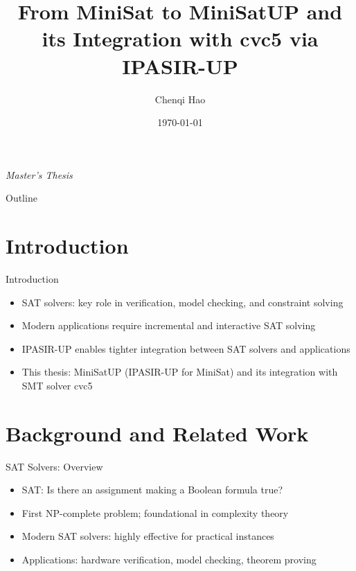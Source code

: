 \documentclass{beamer}
\title[MiniSatUP and its Integration with cvc5]{From MiniSat to MiniSatUP and its Integration with cvc5 via IPASIR-UP}
\author{Chenqi Hao}
\institute{University of Freiburg}
\date{\today}
\begin{document}
\begin{frame}
  \centering \textit{Master's Thesis}
  \titlepage
\end{frame}

\begin{frame}{Outline}
  \tableofcontents
\end{frame}


\section{Introduction}

\begin{frame}{Introduction}
  \begin{itemize}
    \item SAT solvers: key role in verification, model checking, and constraint solving
    \item Modern applications require incremental and interactive SAT solving
    \item IPASIR-UP enables tighter integration between SAT solvers and applications
    \item This thesis: MiniSatUP (IPASIR-UP for MiniSat) and its integration with SMT solver cvc5
  \end{itemize}
\end{frame}


\section{Background and Related Work}

\begin{frame}{SAT Solvers: Overview}
  \begin{itemize}
    \item SAT: Is there an assignment making a Boolean formula true?
    \item First NP-complete problem; foundational in complexity theory
    \item Modern SAT solvers: highly effective for practical instances
    \item Applications: hardware verification, model checking, theorem proving
  \end{itemize}
\end{frame}
\end{document}
